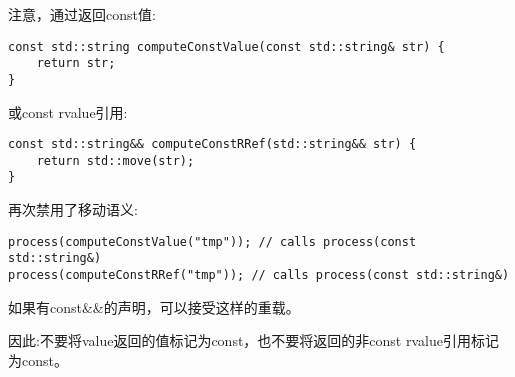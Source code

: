 注意，通过返回const值:\par

\begin{lstlisting}[caption={}]
const std::string computeConstValue(const std::string& str) {
	return str;
}
\end{lstlisting}

或const rvalue引用:\par

\begin{lstlisting}[caption={}]
const std::string&& computeConstRRef(std::string&& str) {
	return std::move(str);
}
\end{lstlisting}

再次禁用了移动语义:\par

\begin{lstlisting}[caption={}]
process(computeConstValue("tmp")); // calls process(const std::string&)
process(computeConstRRef("tmp")); // calls process(const std::string&)
\end{lstlisting}

如果有const\&\&的声明，可以接受这样的重载。\par

因此:不要将value返回的值标记为const，也不要将返回的非const rvalue引用标记为const。\par


